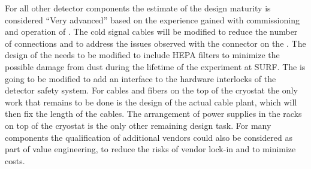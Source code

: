 For all other detector components the estimate of the design
maturity is considered ``Very advanced'' based on the experience
gained with commissioning and operation of . The 
cold signal cables will be modified to reduce the number of
connections and to address the issues observed with the connector
on the . The design of the  needs to
be modified to include HEPA filters to minimize the possible
damage from dust during the lifetime of the experiment at SURF.
The  is going to be modified to add an interface to
the hardware interlocks of the detector safety system. For
cables and fibers on the top of the cryostat the only work that
remains to be done is the design of the actual cable plant, 
which will then fix the length of the cables. The arrangement
of power supplies in the racks on top of the cryostat is the
only other remaining design task. For many components the
qualification of additional vendors could also be considered
as part of value engineering, to reduce the risks of vendor
lock-in and to minimize costs. 


